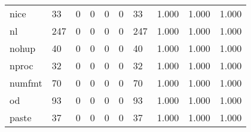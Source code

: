 \begin{longtable}{lp{2.0cm}p{2.0cm}p{2.0cm}p{2.0cm}p{2.0cm}p{2.0cm}p{2.0cm}p{2.0cm}p{2.0cm}}
nice      &                     33 &                                             0 &                                            0 &                                           0 &                                            0 &                                         33 &                                1.000 &                                  1.000 &                                1.000 \\
nl        &                    247 &                                             0 &                                            0 &                                           0 &                                            0 &                                        247 &                                1.000 &                                  1.000 &                                1.000 \\
nohup     &                     40 &                                             0 &                                            0 &                                           0 &                                            0 &                                         40 &                                1.000 &                                  1.000 &                                1.000 \\
nproc     &                     32 &                                             0 &                                            0 &                                           0 &                                            0 &                                         32 &                                1.000 &                                  1.000 &                                1.000 \\
numfmt    &                     70 &                                             0 &                                            0 &                                           0 &                                            0 &                                         70 &                                1.000 &                                  1.000 &                                1.000 \\
od        &                     93 &                                             0 &                                            0 &                                           0 &                                            0 &                                         93 &                                1.000 &                                  1.000 &                                1.000 \\
paste     &                     37 &                                             0 &                                            0 &                                           0 &                                            0 &                                         37 &                                1.000 &                                  1.000 &                                1.000 \\

\end{longtable}
